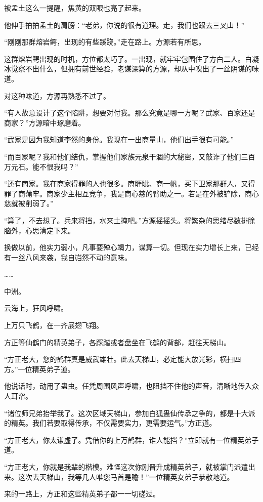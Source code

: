 \begin{this_body}
被孟土这么一提醒，焦黄的双眼也亮了起来。

他伸手拍拍孟土的肩膀：“老弟，你说的很有道理。走，我们也跟去三叉山！”

“刚刚那群熔岩鳄，出现的有些蹊跷。”走在路上。方源若有所思。

这群熔岩鳄出现的时机，方位都太巧了。一出现，就牢牢包围住了方白二人。白凝冰觉察不出什么，但拥有前世经验，老谋深算的方源，却从中嗅出了一丝阴谋的味道。

对这种味道，方源再熟悉不过了。

“有人故意设计了这个陷阱，想要对付我。那么究竟是哪一方呢？武家、百家还是商家？”方源暗中琢磨着。

“武家是因为我知道李然的身份。我现在一出商量山，他们出手很有可能。”

“而百家呢？我和他们结仇，掌握他们家族元泉干涸的大秘密，又敲诈了他们三百万元石。能不恨我吗？”

“还有商家。我在商家得罪的人也很多。商睚眦、商一帆，买下卫家那群人，又得罪了商蒲牢。商家少主相互竞争，我是商心慈的臂助之一。若是在外被铲除，商心慈就被削弱了。”

“算了，不去想了。兵来将挡，水来土掩吧。”方源摇摇头。将繁杂的思绪尽数排除脑外，心思清定下来。

换做以前，他实力弱小，凡事要殚心竭力，谋算一切。但现在实力增长上来，已经有一丝八风来袭，我自岿然不动的意味。

……

中洲。

云海上，狂风呼啸。

上万只飞鹤，在一齐展翅飞翔。

方正等仙鹤门的精英弟子，各踩踏或者盘坐在飞鹤的背部，赶往天梯山。

“方正老大，您的鹤群真是威武雄壮。此去天梯山，必定能大放光彩，横扫四方。”一位精英弟子道。

他说话时，动用了蛊虫。任凭周围风声呼啸，也阻挡不住他的声音，清晰地传入众人耳帘。

“诸位师兄弟抬举我了。这次区域天梯山，参加白狐蛊仙传承之争的，都是十大派的精英。我们若要取得传承，不仅需要实力，更需要运气。”方正道。

“方正老大，你太谦虚了。凭借你的上万鹤群，谁人能挡？”立即就有一位精英弟子道。

“方正老大，你就是我辈的楷模。难怪这次你刚晋升成精英弟子，就被掌门派遣出来。这次去天梯山，我等几人唯您马首是瞻！”一位精英女弟子恭敬地道。

来的一路上，方正和这些精英弟子都一一切磋过。


\end{this_body}
